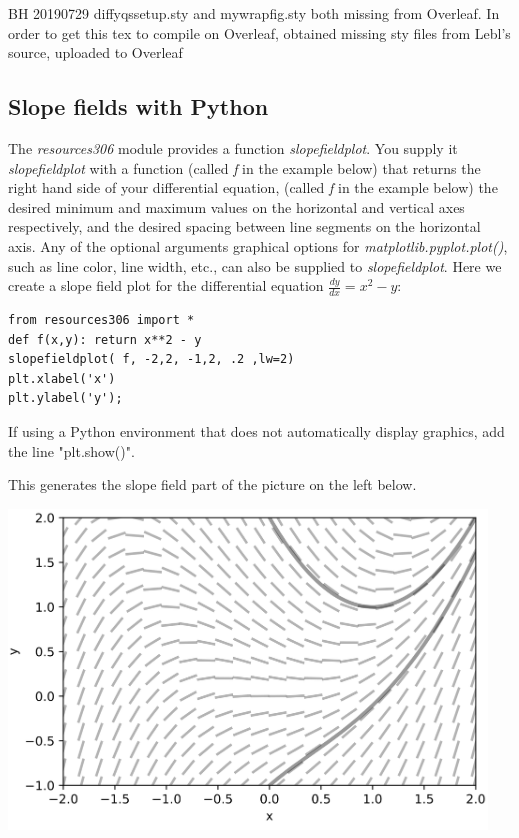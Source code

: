 \documentclass[12pt]{book}
\begin{document}
{\color{teal}BH 20190729 diffyqssetup.sty and mywrapfig.sty 
both missing from Overleaf. In order to get this tex 
to compile on Overleaf, obtained missing sty files from Lebl's source, uploaded to Overleaf}

\subsection{Slope fields with Python}

The \emph{resources306} module provides a function \emph{slopefieldplot}.
You supply {\color{red}it} 
{\color{blue}\emph{slopefieldplot}} with a function {\color{blue}(called \emph{f} in the example below)} that returns the right hand side of your differential equation,
{\color{red}(called \emph{f} in the example below)} the desired minimum and maximum values on the horizontal and vertical axes respectively, and
the desired spacing between line segments on the horizontal axis. 
Any of the {\color{red}optional arguments} {\color{blue}graphical options} for \emph{matplotlib.pyplot.plot()}, such as line color, line width, etc., can also be supplied to \emph{slopefieldplot}.
Here we create a slope field plot for the differential equation $\frac{dy}{dx} = x^2 - y$:
\begin{small}
\begin{verbatim}
from resources306 import *
def f(x,y): return x**2 - y
slopefieldplot( f, -2,2, -1,2, .2 ,lw=2)
plt.xlabel('x')
plt.ylabel('y');
\end{verbatim}
\end{small}
{\color{blue}
If using a Python environment that does not automatically display graphics,
add the line "plt.show()".}

\noindent This generates the {\color{blue}slope field part} of the picture {\color{red}on the left} below.

\parbox[c]{3.1in}{\includegraphics[width=5.0in]{additional_figures/First_order_ODEs__slopfieldplot_with_solutions}}
\end{document}
